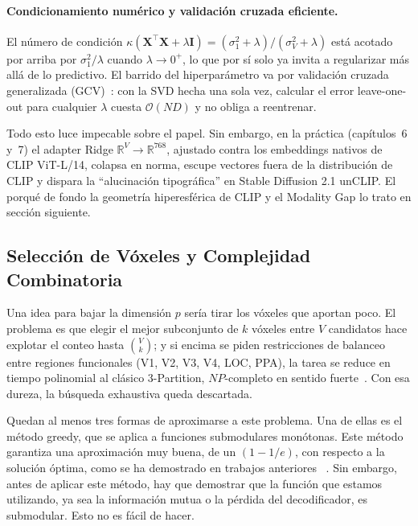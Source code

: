 \paragraph{Condicionamiento numérico y validación cruzada eficiente.} El número de condición 
$\kappa(\mathbf{X}^\top\mathbf{X}+\lambda\mathbf{I}) = (\sigma_1^2+\lambda)/(\sigma_V^2+\lambda)$ 
está acotado por arriba por $\sigma_1^2/\lambda$ cuando $\lambda\!\to\!0^+$, lo que por sí 
solo ya invita a regularizar más allá de lo predictivo. El barrido del hiperparámetro va por 
validación cruzada generalizada (GCV)~\cite{hastie2009elements}: con la SVD hecha una sola vez, 
calcular el error leave-one-out para cualquier $\lambda$ cuesta $\mathcal{O}(N D)$ y no obliga 
a reentrenar.

Todo esto luce impecable sobre el papel. Sin embargo, en la práctica (capítulos~6 y~7) el 
adapter Ridge $\mathbb{R}^V \rightarrow \mathbb{R}^{768}$, ajustado contra los embeddings 
nativos de CLIP ViT-L/14, colapsa en norma, escupe vectores fuera de la distribución de CLIP 
y dispara la ``alucinación tipográfica'' en Stable Diffusion 2.1 unCLIP. El porqué de fondo 
la geometría hiperesférica de CLIP y el Modality Gap lo trato en sección siguiente.

\subsection{Selección de Vóxeles y Complejidad Combinatoria}\label{sec:voxel_selection}

Una idea para bajar la dimensión $p$ sería tirar los vóxeles que aportan poco. El problema es 
que elegir el mejor subconjunto de $k$ vóxeles entre $V$ candidatos hace explotar el conteo 
hasta $\binom{V}{k}$; y si encima se piden restricciones de balanceo entre regiones funcionales 
(V1, V2, V3, V4, LOC, PPA), la tarea se reduce en tiempo polinomial al clásico 3-Partition, 
$NP$-completo en sentido fuerte~\cite{garey1979computers}. Con esa dureza, la búsqueda 
exhaustiva queda descartada.

Quedan al menos tres formas de aproximarse a este problema. Una de ellas es el método greedy, que se aplica a funciones submodulares monótonas. Este método garantiza una aproximación muy buena, de un $(1 - 1/e)$, con respecto a la solución óptima, como se ha demostrado en trabajos anteriores ~\cite{nemhauser1978,krause2014submodular}. Sin embargo, antes de aplicar este método, hay que demostrar que la función que estamos utilizando, ya sea la información mutua o la pérdida del decodificador, es submodular. Esto no es fácil de hacer.

